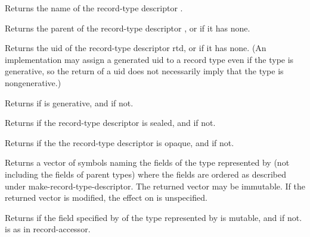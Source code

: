 \begin{entry}{%
}
   
Returns the name of the record-type descriptor .
\end{entry}   

\begin{entry}{%
}
   
Returns the parent of the record-type descriptor , or
\schfalse{} if it has none.
\end{entry}

\begin{entry}{%
}
   
Returns the uid of the record-type descriptor rtd, or \schfalse{} if it has none.
(An implementation may assign a generated uid to a record type even if the
type is generative, so the return of a uid does not necessarily imply that
the type is nongenerative.)
\end{entry}

\begin{entry}{%
}
   
Returns \schtrue{} if  is generative, and \schfalse{} if not.
\end{entry}

\begin{entry}{%
}

Returns \schtrue{} if the record-type descriptor is
sealed, and \schfalse{} if not.
\end{entry}

\begin{entry}{%
}
   
Returns \schtrue{} if the the record-type descriptor is
opaque, and \schfalse{} if not.
\end{entry}

\begin{entry}{%
}
   
Returns a vector of symbols naming the fields of the type represented by 
(not including the fields of parent types) where the fields are ordered as
described under {\cf make-record-type-descriptor}.  The returned
vector may be immutable.
If the returned vector is modified, the effect on 
 is unspecified.
\end{entry}

\begin{entry}{%
}
   
Returns \schtrue{} if the field specified by
 of the type represented by  is mutable, and
\schfalse{} if not.   is as in {\cf record-accessor}.
\end{entry}

